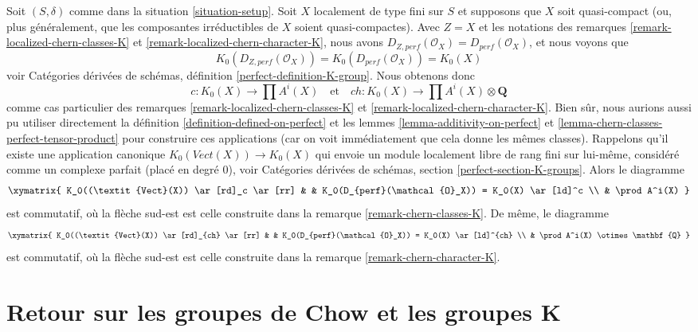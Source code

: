 \begin{remark}
\label{remark-chern-classes-agree}
Soit $(S, \delta)$ comme dans la situation \ref{situation-setup}.
Soit $X$ localement de type fini sur $S$ et supposons que $X$
soit quasi-compact (ou, plus généralement, que les composantes irréductibles
de $X$ soient quasi-compactes). Avec $Z = X$ et les notations des
remarques \ref{remark-localized-chern-classes-K} et
\ref{remark-localized-chern-character-K},
nous avons $D_{Z, perf}(\mathcal{O}_X) = D_{perf}(\mathcal{O}_X)$,
et nous voyons que
$$
K_0(D_{Z, perf}(\mathcal{O}_X)) = K_0(D_{perf}(\mathcal{O}_X)) = K_0(X)
$$
voir
Catégories dérivées de schémas, définition \ref{perfect-definition-K-group}.
Nous obtenons donc
$$
c : K_0(X) \to \prod A^i(X)
\quad\text{et}\quad
ch : K_0(X) \to \prod A^i(X) \otimes \mathbf{Q}
$$
comme cas particulier des remarques \ref{remark-localized-chern-classes-K} et
\ref{remark-localized-chern-character-K}. Bien sûr, nous aurions aussi pu
utiliser directement la définition \ref{definition-defined-on-perfect} et les
lemmes \ref{lemma-additivity-on-perfect} et
\ref{lemma-chern-classes-perfect-tensor-product} pour construire ces applications
(car on voit immédiatement que cela donne les mêmes classes).
Rappelons qu'il existe une application canonique $K_0(\textit{Vect}(X)) \to K_0(X)$
qui envoie un module localement libre de rang fini sur lui-même, considéré
comme un complexe parfait (placé en degré $0$), voir
Catégories dérivées de schémas, section \ref{perfect-section-K-groups}.
Alors le diagramme
$$
\xymatrix{
K_0((\textit{Vect}(X)) \ar[rd]_c \ar[rr] & &
K_0(D_{perf}(\mathcal{O}_X)) = K_0(X) \ar[ld]^c \\
& \prod A^i(X)
}
$$
est commutatif, où la flèche sud-est est celle construite dans la
remarque \ref{remark-chern-classes-K}. De même, le diagramme
$$
\xymatrix{
K_0((\textit{Vect}(X)) \ar[rd]_{ch} \ar[rr] & &
K_0(D_{perf}(\mathcal{O}_X)) = K_0(X) \ar[ld]^{ch} \\
& \prod A^i(X) \otimes \mathbf{Q}
}
$$
est commutatif, où la flèche sud-est est celle construite dans la
remarque \ref{remark-chern-character-K}.
\end{remark}











\section{Retour sur les groupes de Chow et les groupes K}
\label{section-chow-and-K-II}

